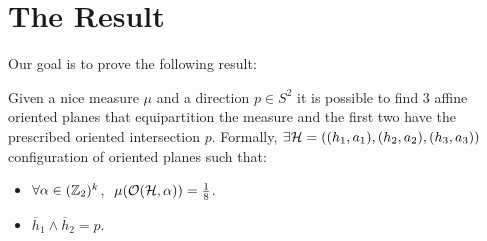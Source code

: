 \documentclass[10pt]{article}
\begin{document}
\section*{The Result}
Our goal is to prove the following result:
\begin{theorem}
	Given a nice measure $\mu$ and a direction $p\in S^2$ it is possible to find $3$ affine oriented planes that equipartition the measure and the
	first two have the prescribed oriented intersection $p$. Formally, $\exists \mathcal{H}=((h_1, a_1), (h_2, a_2), (h_3, a_3))$ configuration of oriented planes such that:
	\begin{itemize}
		\item $\forall \alpha\in (\mathbb{Z}_2)^k$, $\ \mu(\mathcal{O}(\mathcal{H}, \alpha))= \frac{1}{8}$.
		\item $\overline{h}_1\wedge \overline{h}_2 = p$.
	\end{itemize}
\end{theorem}
\end{document}
